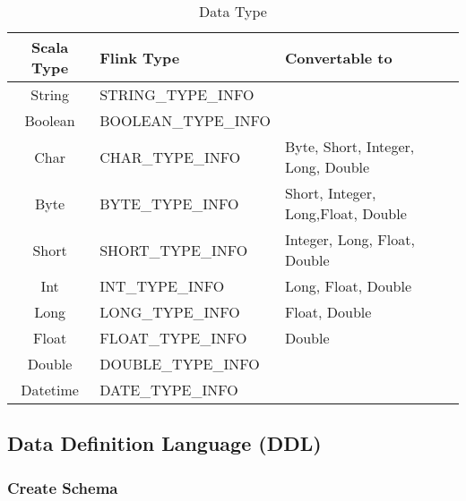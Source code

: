 \begin{table}[h]
\caption{Data Type}
\centering
\label{table:Data Type}
\setlength\extrarowheight{5pt}
\begin{tabular}{||c|l|l||}
\hline
\textbf{Scala Type} &  \textbf{Flink Type} & \textbf{Convertable to} \\ \hline\hline
                    String               &           STRING\_TYPE\_INFO                   &  \\ \hline
                    Boolean				&           BOOLEAN\_TYPE\_INFO                  &   \\ \hline
                   Char					&           CHAR\_TYPE\_INFO                       &  Byte, Short, Integer, Long, Double\\ \hline
					Byte		           	&           BYTE\_TYPE\_INFO                     & Short, Integer, Long,Float, Double \\ \hline
					Short				&           SHORT\_TYPE\_INFO                    & Integer, Long, Float, Double\\ \hline								
					Int					&           INT\_TYPE\_INFO                      & Long, Float, Double\\ \hline
					Long			 		&           LONG\_TYPE\_INFO                     & Float, Double \\ \hline								
					Float				&           FLOAT\_TYPE\_INFO                    & Double \\ \hline
					Double				&           DOUBLE\_TYPE\_INFO                   &   \\ \hline							
	Datetime				&           DATE\_TYPE\_INFO                &        	\\ \hline           							           							           							           							           
\end{tabular}
\end{table}



\subsection{Data Definition Language (DDL)}
\subsubsection{Create Schema}

